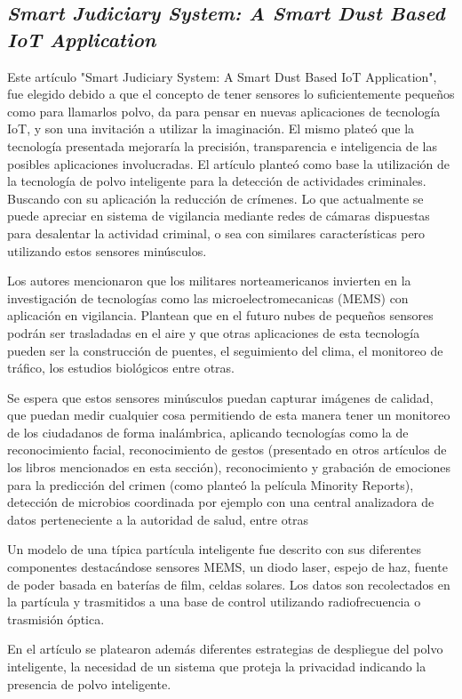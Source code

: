 \subsection{
    \textbf{\emph{Smart Judiciary System: A Smart Dust
            Based IoT Application}
    }
}

Este artículo "Smart Judiciary System: A Smart Dust
Based IoT Application"\cite[pág.128]{somaniEmerging2019}, fue elegido debido a que el concepto de tener sensores lo suficientemente pequeños como para llamarlos polvo, da para pensar en nuevas aplicaciones de tecnología IoT, y son una invitación a utilizar la imaginación.
El mismo plateó que la tecnología presentada mejoraría la precisión, transparencia e inteligencia de las posibles aplicaciones involucradas.
El artículo planteó como base la utilización de la tecnología de polvo inteligente para la detección de actividades criminales.
Buscando con su aplicación la reducción de crímenes. Lo que actualmente se puede apreciar en sistema de vigilancia mediante redes de cámaras dispuestas
para desalentar la actividad criminal, o sea con similares características pero utilizando estos sensores minúsculos.\par

Los autores mencionaron que los militares norteamericanos invierten en la investigación de tecnologías como las microelectromecanicas (MEMS) con aplicación en vigilancia. Plantean que en el futuro nubes de pequeños sensores podrán ser trasladadas en el aire y que otras aplicaciones de esta tecnología pueden ser la construcción de puentes, el seguimiento del clima, el monitoreo de tráfico, los estudios biológicos entre otras.\par

Se espera que estos sensores minúsculos puedan capturar imágenes de calidad, que puedan medir cualquier cosa permitiendo de esta manera tener un monitoreo de los ciudadanos de forma inalámbrica, aplicando tecnologías como la de reconocimiento facial, reconocimiento de gestos (presentado en otros artículos de los libros mencionados en esta sección), reconocimiento y grabación de emociones para la predicción del crimen (como planteó la película Minority Reports), detección de microbios coordinada por ejemplo con una central analizadora de datos perteneciente a la autoridad de salud, entre otras\par

Un modelo de una típica partícula inteligente fue descrito con sus diferentes componentes destacándose sensores MEMS, un diodo laser, espejo de haz, fuente de poder basada en baterías de film, celdas solares. Los datos son recolectados en  la partícula y trasmitidos a una base de control utilizando radiofrecuencia o trasmisión óptica.\par

En el artículo se platearon además diferentes estrategias de despliegue del polvo inteligente, la necesidad de un sistema que proteja la privacidad indicando la presencia de polvo inteligente.\par

